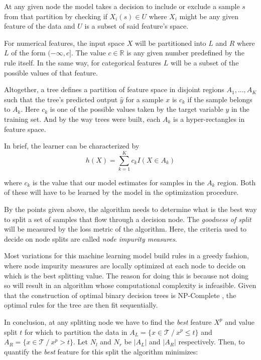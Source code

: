 At any given node the model takes a decision to include or exclude a sample $s$ from that partition by checking if $X_i(s) \in U$ where $X_i$ might be any given feature of the data and $U$ is a subset of said feature's space.

For numerical features, the input space $X$ will be partitioned into $L$ and $R$ where $L$ of the form $(-\infty,c]$. The value $c \in \mathbb{R}$ is any given number predefined by the rule itself. In the same way, for categorical features $L$ will be a subset of the possible values of that feature.

Altogether, a tree defines a partition of feature space in disjoint regions $A_1,...,A_K$ such that the tree's predicted output $\hat{y}$ for a sample $x$ is $c_k$ if the sample belongs to $A_k$. Here $c_k$ is one of the possible values taken by the target variable $y$ in the training set. And by the way trees were built, each $A_k$ is a hyper-rectangles in feature space.

In brief, the learner can be characterized by
\begin{equation}
h(X) = \sum_{k=1}^K c_k I(X \in A_k)
\end{equation}\label{equation-decisionTreeModel}

where $c_k$ is the value that our model estimates for samples in the $A_k$ region. Both of these will have to be learned by the model in the optimization procedure. %

By the points given above, the algorithm needs to determine what is the best way to split a set of samples that flow through a decision node. The \textit{goodness of split} will be measured by the loss metric of the algorithm. Here, the criteria used to decide on node splits are called \textit{node impurity measures}.

Most variations for this machine learning model build rules in a greedy fashion, where node impurity measures are locally optimized at each node to decide on which is the best splitting value. The reason for doing this is because not doing so will result in an algorithm whose computational complexity is infeasible. Given that the construction of optimal binary decision trees is NP-Complete \textcite{decisionTreesNP}, the optimal rules for the tree are then fit sequentially.

In conclusion, at any splitting node we have to find the \textit{best} feature $X^p$ and value split $t$ for which to partition the data in
$A_L = \{x \in \mathcal{T} \ / \ x^p \leq t \} $ and $A_R = \{x \in \mathcal{T}\ / \ x^p> t \} $. Let $N_l$ and $N_r$ be $|A_L|$ and $|A_R|$ respectively. Then, to quantify the \textit{best} feature for this split the algorithm minimizes:

